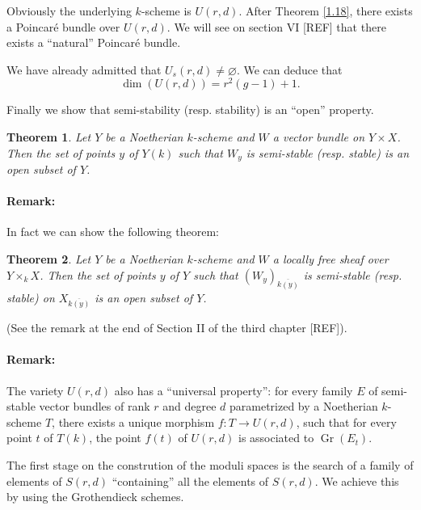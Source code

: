\documentclass[12pt,a4paper]{book}
\DeclareMathOperator\Gr{Gr}
\newtheorem{thm}{Theorem}[chapter]
\theoremstyle{definition} \newtheorem{defn}[thm]{Definition}
\theoremstyle{definition} \newtheorem{ejs}[thm]{Examples}
\theoremstyle{definition} \newtheorem{ej}[thm]{Example}
\newenvironment{thmbis}[1]
{\renewcommand{\thethm}{\ref{#1}$'$}%
\addtocounter{thm}{-1}%
\begin{thm}}{\end{thm}}
\renewcommand{\thethm}{\arabic{thm}}
\begin{document}
  Obviously the underlying $k$-scheme is $U(r,d)$. After Theorem \ref{1.18}, there exists a Poincaré bundle over $U(r,d)$. We will see on section VI [REF] that there exists a ``natural'' Poincaré bundle.

  We have already admitted that $U_s(r,d)\neq \varnothing$. We can deduce that
  \begin{equation*}
    \dim(U(r,d))= r^2(g-1) +1.
  \end{equation*}

  Finally we show that semi-stability (resp. stability) is an ``open'' property.

  \begin{thm}\label{1.19}
    Let $Y$ be a Noetherian $k$-scheme and $W$ a vector bundle on $Y\times X$. Then the set of points $y$ of $Y(k)$ such that $W_y$ is semi-stable (resp. stable) is an open subset of $Y$.
  \end{thm}

  \paragraph{Remark:} In fact we can show the following theorem:

  \begin{thmbis}{1.19} \label{1.19'}
    Let $Y$ be a Noetherian $k$-scheme and $W$ a locally free sheaf over $Y\times_k X$. Then the set of points $y$ of $Y$ such that $(W_y)_{\overline{k(y)}}$ is semi-stable (resp. stable) on $X_{\overline{k(y)}}$ is an open subset of $Y$.
  \end{thmbis}

  (See the remark at the end of Section II of the third chapter [REF]).
  
  \paragraph{Remark:} The variety $U(r,d)$ also has a ``universal property'': for every family $E$ of semi-stable vector bundles of rank $r$ and degree $d$ parametrized by a Noetherian $k$-scheme $T$, there exists a unique morphism $f:T\rightarrow U(r,d)$, such that for every point $t$ of $T(k)$, the point $f(t)$ of $U(r,d)$ is associated to $\Gr(E_t)$.

  The first stage on the constrution of the moduli spaces is the search of a family of elements of $S(r,d)$ ``containing'' all the elements of $S(r,d)$. We achieve this by using the Grothendieck schemes.
\end{document}
